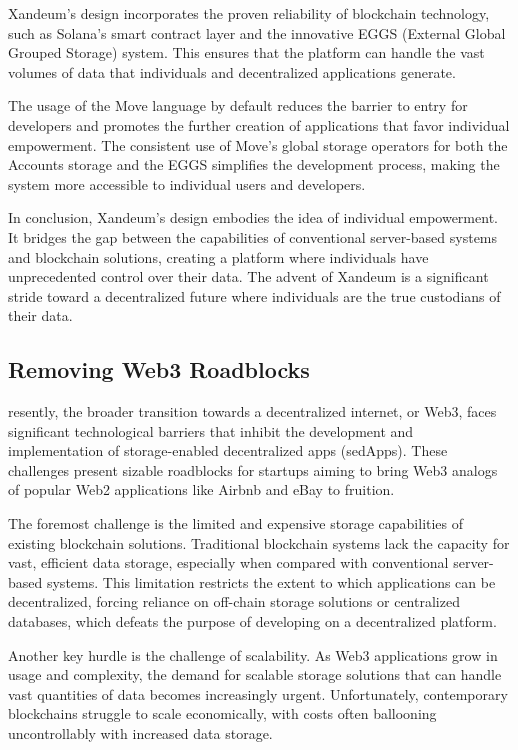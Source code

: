 \documentclass[11pt]{article}   	%
\begin{document}
Xandeum's design incorporates the proven reliability of blockchain technology, such as Solana's smart contract layer and the innovative EGGS (External Global Grouped Storage) system. This ensures that the platform can handle the vast volumes of data that individuals and decentralized applications generate.

The usage of the Move language by default reduces the barrier to entry for developers and promotes the further creation of applications that favor individual empowerment. The consistent use of Move's global storage operators for both the Accounts storage and the EGGS simplifies the development process, making the system more accessible to individual users and developers.

In conclusion, Xandeum's design embodies the idea of individual empowerment. It bridges the gap between the capabilities of conventional server-based systems and blockchain solutions, creating a platform where individuals have unprecedented control over their data. The advent of Xandeum is a significant stride toward a decentralized future where individuals are the true custodians of their data.

\subsection{Removing Web3 Roadblocks}
resently, the broader transition towards a decentralized internet, or Web3, faces significant technological barriers that inhibit the development and implementation of storage-enabled decentralized apps (sedApps). These challenges present sizable roadblocks for startups aiming to bring Web3 analogs of popular Web2 applications like Airbnb and eBay to fruition.

The foremost challenge is the limited and expensive storage capabilities of existing blockchain solutions. Traditional blockchain systems lack the capacity for vast, efficient data storage, especially when compared with conventional server-based systems. This limitation restricts the extent to which applications can be decentralized, forcing reliance on off-chain storage solutions or centralized databases, which defeats the purpose of developing on a decentralized platform.

Another key hurdle is the challenge of scalability. As Web3 applications grow in usage and complexity, the demand for scalable storage solutions that can handle vast quantities of data becomes increasingly urgent. Unfortunately, contemporary blockchains struggle to scale economically, with costs often ballooning uncontrollably with increased data storage.
\end{document}
